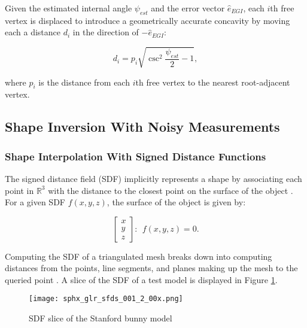 Given the estimated internal angle $\psi_{est}$ and the error vector $\hat{e}_{EGI}$, each $i$th free vertex is displaced to introduce a geometrically accurate concavity by moving each a distance $d_i$ in the direction of $-\hat{e}_{EGI}$:

\begin{equation} \label{eq:flip_depth}
  d_i = p_i \sqrt{\csc^2 \frac{\psi_{est}}{2} - 1},
\end{equation}

where $p_i$ is the distance from each $i$th free vertex to the nearest root-adjacent vertex.

\subsection{Shape Inversion With Noisy Measurements}

\subsubsection{Shape Interpolation With Signed Distance Functions}

The signed distance field (SDF) implicitly represents a shape by associating each point in $\mathbb{R}^3$ with the distance to the closest point on the surface of the object \cite{baerentzen2002}. For a given SDF $f(x, y, z)$, the surface of the object is given by:

\begin{equation} \label{eq:sdf_zero_level_set}
  \begin{bmatrix} x \\ y \\ z \end{bmatrix} : \: \: f(x, y, z) = 0.
\end{equation}

Computing the SDF of a triangulated mesh breaks down into computing distances from the points, line segments, and planes making up the mesh to the queried point \cite{baerentzen2002}. A slice of the SDF of a test model is displayed in Figure \ref{fig:sdf_slice}.

\graphicspath{{/Users/liamrobinson/Documents/PyLightCurves/docs/build/html/_images}}
\begin{figure}[!htb]
  \centering
  \texttt{[image: sphx\_glr\_sfds\_001\_2\_00x.png]}
  \caption{SDF slice of the Stanford bunny model}
  \label{fig:sdf_slice}
\end{figure}

